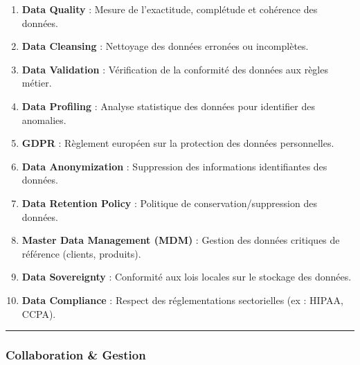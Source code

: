 \documentclass[
  letterpaper,
  DIV=11,
  numbers=noendperiod]{scrartcl}
\providecommand{\tightlist}{%
  \setlength{\itemsep}{0pt}\setlength{\parskip}{0pt}}\usepackage{longtable,booktabs,array}
\begin{document}
\begin{enumerate}
\def\labelenumi{\arabic{enumi}.}
\setcounter{enumi}{30}
\tightlist
\item
  \textbf{Data Quality} : Mesure de l'exactitude, complétude et
  cohérence des données.\\
\item
  \textbf{Data Cleansing} : Nettoyage des données erronées ou
  incomplètes.\\
\item
  \textbf{Data Validation} : Vérification de la conformité des données
  aux règles métier.\\
\item
  \textbf{Data Profiling} : Analyse statistique des données pour
  identifier des anomalies.\\
\item
  \textbf{GDPR} : Règlement européen sur la protection des données
  personnelles.\\
\item
  \textbf{Data Anonymization} : Suppression des informations
  identifiantes des données.\\
\item
  \textbf{Data Retention Policy} : Politique de conservation/suppression
  des données.\\
\item
  \textbf{Master Data Management (MDM)} : Gestion des données critiques
  de référence (clients, produits).\\
\item
  \textbf{Data Sovereignty} : Conformité aux lois locales sur le
  stockage des données.\\
\item
  \textbf{Data Compliance} : Respect des réglementations sectorielles
  (ex : HIPAA, CCPA).
\end{enumerate}

\begin{center}\rule{0.5\linewidth}{0.5pt}\end{center}

\subsubsection{\texorpdfstring{\textbf{Collaboration \&
Gestion}}{Collaboration \& Gestion}}\label{collaboration-gestion}
\end{document}
